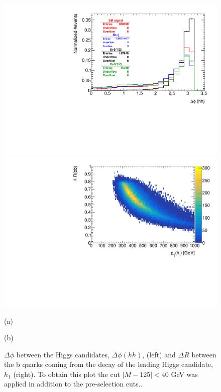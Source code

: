 \begin{figure}
	\centering
	\begin{minipage}{.5\textwidth}
		\centering
		\includegraphics[width=\linewidth]{./Figures/hist_hh_deltaPhi.pdf}
	\end{minipage}%
	\begin{minipage}{.5\textwidth}
		\centering
		\includegraphics[width=\linewidth]{./Figures/hist_deltaR_bb_pt.pdf}
	\end{minipage}
	\begin{minipage}[t]{0.5\textwidth}
		\caption*{(a)}
	\end{minipage}%
	\hfill
	\begin{minipage}[t]{0.5\textwidth}
		\caption*{(b)}
	\end{minipage}
	\caption{$\Delta\phi$ between the Higgs candidates, $\Delta\phi(hh)$, (left) and $\Delta R$ between the b quarks coming from the decay of the leading Higgs candidate, $h_1$ (right). To obtain this plot the cut $|M-125|<40$ GeV was applied in addition to the pre-selection cuts..}
	\label{fig:deltaPhi_deltaR}
\end{figure}

